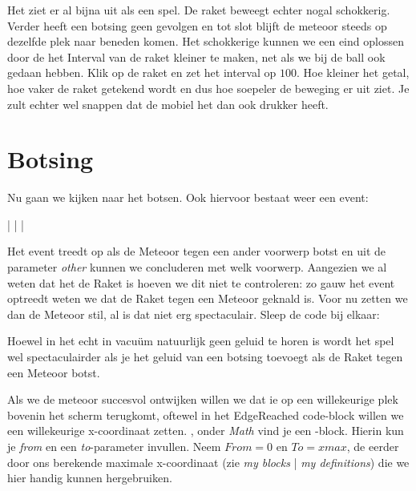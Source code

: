 
\runOpTelefoon{}
Het ziet er al bijna uit als een spel. De raket beweegt echter nogal schokkerig. Verder heeft een botsing geen gevolgen en tot slot blijft de meteoor steeds op dezelfde plek naar beneden komen. Het schokkerige kunnen we een eind oplossen door de het Interval van de raket kleiner te maken, net als we bij de ball ook gedaan hebben. Klik op de raket en zet het interval op $100$. Hoe kleiner het getal, hoe vaker de raket getekend wordt en dus hoe soepeler de beweging er uit ziet. Je zult echter wel snappen dat de mobiel het dan ook drukker heeft. 

\runOpTelefoon{}

\section{Botsing}	
Nu gaan we kijken naar het botsen. Ook hiervoor  bestaat weer een event:

    |  |  | 
	\linebreak {} 

Het event treedt op als de Meteoor tegen een ander voorwerp botst en uit de parameter \emph{other} kunnen we concluderen met welk voorwerp. Aangezien we al weten dat het de Raket is hoeven we dit niet te controleren: zo gauw het event optreedt weten we dat de Raket tegen een Meteoor geknald is. Voor nu zetten we dan de Meteoor stil, al is dat niet erg spectaculair. Sleep de code bij elkaar:


\runOpTelefoon{}
\begin{opgave}
   \opgVraag
	Hoewel in het echt in vacu\"um natuurlijk geen geluid te horen is wordt het spel wel spectaculairder als je het geluid van een botsing toevoegt als de Raket tegen een Meteoor botst. 
\end{opgave}


Als we de meteoor succesvol ontwijken willen we dat ie op een willekeurige plek bovenin het scherm terugkomt, oftewel in het EdgeReached code-block willen we een willekeurige x-coordinaat zetten.  , onder \emph{Math} vind je een -block. Hierin kun je \emph{from} en een \emph{to}-parameter invullen. Neem $ From=0 $ en $ To=xmax $, de eerder door ons berekende maximale x-coordinaat (zie \emph{my blocks} | \emph{my definitions}) die we hier handig kunnen hergebruiken. 

